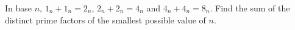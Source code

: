 In base $n$, $1_n+1_n=2_n$, $2_n+2_n=4_n$ and $4_n+4_n=8_n$. Find the sum of the distinct prime factors of the smallest possible value of $n$.
